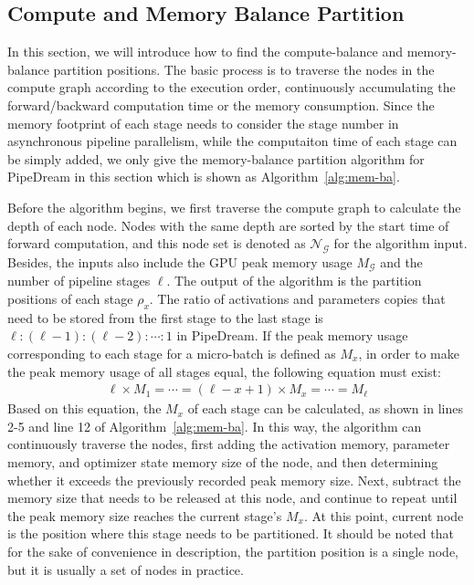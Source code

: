\subsection{Compute and Memory Balance Partition}
In this section, we will introduce how to find the compute-balance and memory-balance partition positions.
The basic process is to traverse the nodes in the compute graph according to the execution order,
continuously accumulating the forward/backward computation time or the memory consumption.
Since the memory footprint of each stage needs to consider the
stage number in asynchronous pipeline parallelism,
while the computaiton time of each stage can be simply added,
we only give the memory-balance partition algorithm for PipeDream
in this section which is shown as Algorithm~\ref{alg:mem-ba}.

Before the algorithm begins,
we first traverse the compute graph to calculate the depth of each node.
Nodes with the same depth are sorted by the start time of forward computation,
and this node set is denoted as $\mathcal{N}_\mathcal{G}$ for the algorithm input.
Besides, the inputs also include the GPU peak memory usage $M_\mathcal{G}$ and the number of pipeline stages $\ell$.
The output of the algorithm is the partition positions of each stage $\rho_x$.
The ratio of activations and parameters copies that need to be stored from the first stage
to the last stage is $\ell:(\ell-1):(\ell-2):\cdots:1$ in PipeDream.
If the peak memory usage corresponding to each stage for a micro-batch is defined as $M_x$,
in order to make the peak memory usage of all stages equal,
the following equation must exist:
\begin{align}
  \ell \times M_1=\cdots=(\ell-x+1) \times M_x=\cdots=M_{\ell}
\end{align}
Based on this equation, the $M_x$ of each stage can be calculated,
as shown in lines 2-5 and line 12 of Algorithm~\ref{alg:mem-ba}.
In this way, the algorithm can continuously traverse the nodes,
first adding the activation memory, parameter memory, and optimizer state memory size of the node,
and then determining whether it exceeds the previously recorded peak memory size.
Next, subtract the memory size that needs to be released at this node,
and continue to repeat until the peak memory size reaches the current stage's $M_x$.
At this point, current node is the position where this stage needs to be partitioned.
It should be noted that for the sake of convenience in description,
the partition position is a single node,
but it is usually a set of nodes in practice.


